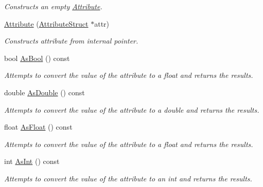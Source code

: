 \begin{DoxyCompactItemize}
\begin{DoxyCompactList}\small\item\em Constructs an empty \hyperlink{classMezzanine_1_1xml_1_1Attribute}{Attribute}. \item\end{DoxyCompactList}\item 
\hyperlink{classMezzanine_1_1xml_1_1Attribute_a8e1475291c327a6ebd018ded6e7ccb3e}{Attribute} (\hyperlink{classAttributeStruct}{AttributeStruct} $\ast$attr)
\begin{DoxyCompactList}\small\item\em Constructs attribute from internal pointer. \item\end{DoxyCompactList}\item 
bool \hyperlink{classMezzanine_1_1xml_1_1Attribute_a573583b7a252bd5f8d96c47c2bedbb16}{AsBool} () const 
\begin{DoxyCompactList}\small\item\em Attempts to convert the value of the attribute to a float and returns the results. \item\end{DoxyCompactList}\item 
double \hyperlink{classMezzanine_1_1xml_1_1Attribute_af7c9a4dd3907c53875b60fffd0737731}{AsDouble} () const 
\begin{DoxyCompactList}\small\item\em Attempts to convert the value of the attribute to a double and returns the results. \item\end{DoxyCompactList}\item 
float \hyperlink{classMezzanine_1_1xml_1_1Attribute_a0b941b115c4ee1a2e9bcffd044a32a86}{AsFloat} () const 
\begin{DoxyCompactList}\small\item\em Attempts to convert the value of the attribute to a float and returns the results. \item\end{DoxyCompactList}\item 
int \hyperlink{classMezzanine_1_1xml_1_1Attribute_afe13b2cfd2ae5425efdfbb7e537c5b02}{AsInt} () const 
\begin{DoxyCompactList}\small\item\em Attempts to convert the value of the attribute to an int and returns the results. \item\end{DoxyCompactList}\item 

\end{DoxyCompactItemize}
